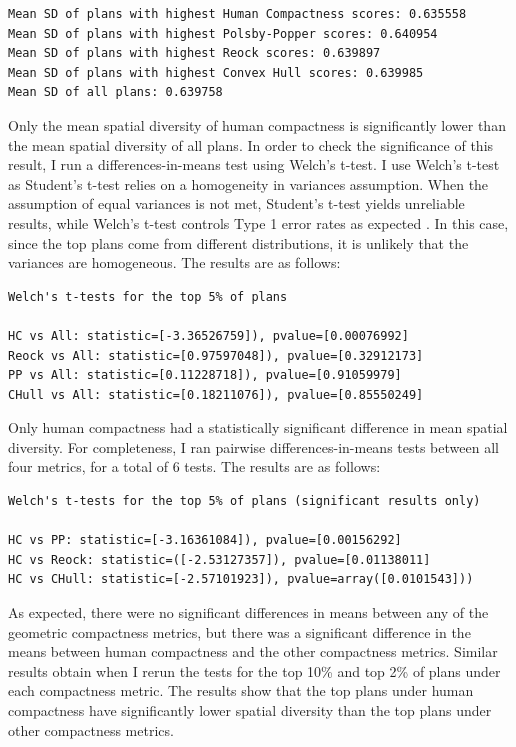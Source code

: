 \documentclass[]{article}
\begin{document}
\begin{verbatim}
Mean SD of plans with highest Human Compactness scores: 0.635558
Mean SD of plans with highest Polsby-Popper scores: 0.640954
Mean SD of plans with highest Reock scores: 0.639897
Mean SD of plans with highest Convex Hull scores: 0.639985
Mean SD of all plans: 0.639758
\end{verbatim}

Only the mean spatial diversity of human compactness is significantly
lower than the mean spatial diversity of all plans. In order to check
the significance of this result, I run a differences-in-means test using
Welch's t-test. I use Welch's t-test as Student's t-test relies on a
homogeneity in variances assumption. When the assumption of equal
variances is not met, Student's t-test yields unreliable results, while
Welch's t-test controls Type 1 error rates as expected
\citep{delacre2017}. In this case, since the top plans come from
different distributions, it is unlikely that the variances are
homogeneous. The results are as follows:

\begin{verbatim}
Welch's t-tests for the top 5% of plans

HC vs All: statistic=[-3.36526759]), pvalue=[0.00076992]
Reock vs All: statistic=[0.97597048]), pvalue=[0.32912173]
PP vs All: statistic=[0.11228718]), pvalue=[0.91059979]
CHull vs All: statistic=[0.18211076]), pvalue=[0.85550249]
\end{verbatim}

Only human compactness had a statistically significant difference in
mean spatial diversity. For completeness, I ran pairwise
differences-in-means tests between all four metrics, for a total of 6
tests. The results are as follows:

\begin{verbatim}
Welch's t-tests for the top 5% of plans (significant results only)

HC vs PP: statistic=[-3.16361084]), pvalue=[0.00156292]
HC vs Reock: statistic=([-2.53127357]), pvalue=[0.01138011]
HC vs CHull: statistic=[-2.57101923]), pvalue=array([0.0101543]))
\end{verbatim}

As expected, there were no significant differences in means between any
of the geometric compactness metrics, but there was a significant
difference in the means between human compactness and the other
compactness metrics. Similar results obtain when I rerun the tests for
the top 10\% and top 2\% of plans under each compactness metric. The
results show that the top plans under human compactness have
significantly lower spatial diversity than the top plans under other
compactness metrics.
\end{document}
